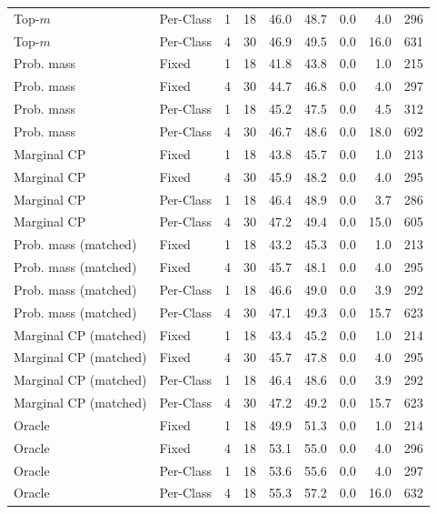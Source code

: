 \begin{tabular}{llrrrrrrr}
Top-$m$ & Per-Class & 1 & 18 & 46.0 & 48.7 & 0.0 & 4.0 & 296 \\
Top-$m$ & Per-Class & 4 & 30 & 46.9 & 49.5 & 0.0 & 16.0 & 631 \\
Prob. mass & Fixed & 1 & 18 & 41.8 & 43.8 & 0.0 & 1.0 & 215 \\
Prob. mass & Fixed & 4 & 30 & 44.7 & 46.8 & 0.0 & 4.0 & 297 \\
Prob. mass & Per-Class & 1 & 18 & 45.2 & 47.5 & 0.0 & 4.5 & 312 \\
Prob. mass & Per-Class & 4 & 30 & 46.7 & 48.6 & 0.0 & 18.0 & 692 \\
Marginal CP & Fixed & 1 & 18 & 43.8 & 45.7 & 0.0 & 1.0 & 213 \\
Marginal CP & Fixed & 4 & 30 & 45.9 & 48.2 & 0.0 & 4.0 & 295 \\
Marginal CP & Per-Class & 1 & 18 & 46.4 & 48.9 & 0.0 & 3.7 & 286 \\
Marginal CP & Per-Class & 4 & 30 & 47.2 & 49.4 & 0.0 & 15.0 & 605 \\
Prob. mass (matched) & Fixed & 1 & 18 & 43.2 & 45.3 & 0.0 & 1.0 & 213 \\
Prob. mass (matched) & Fixed & 4 & 30 & 45.7 & 48.1 & 0.0 & 4.0 & 295 \\
Prob. mass (matched) & Per-Class & 1 & 18 & 46.6 & 49.0 & 0.0 & 3.9 & 292 \\
Prob. mass (matched) & Per-Class & 4 & 30 & 47.1 & 49.3 & 0.0 & 15.7 & 623 \\
Marginal CP (matched) & Fixed & 1 & 18 & 43.4 & 45.2 & 0.0 & 1.0 & 214 \\
Marginal CP (matched) & Fixed & 4 & 30 & 45.7 & 47.8 & 0.0 & 4.0 & 295 \\
Marginal CP (matched) & Per-Class & 1 & 18 & 46.4 & 48.6 & 0.0 & 3.9 & 292 \\
Marginal CP (matched) & Per-Class & 4 & 30 & 47.2 & 49.2 & 0.0 & 15.7 & 623 \\
Oracle & Fixed & 1 & 18 & 49.9 & 51.3 & 0.0 & 1.0 & 214 \\
Oracle & Fixed & 4 & 18 & 53.1 & 55.0 & 0.0 & 4.0 & 296 \\
Oracle & Per-Class & 1 & 18 & 53.6 & 55.6 & 0.0 & 4.0 & 297 \\
Oracle & Per-Class & 4 & 18 & 55.3 & 57.2 & 0.0 & 16.0 & 632 \\
\bottomrule
\end{tabular}
